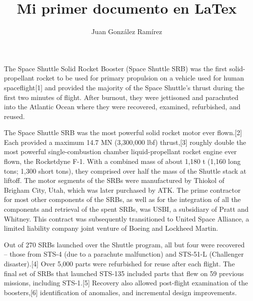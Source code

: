 \documentclass{article}
\title{Mi primer documento en LaTex} %
\author{Juan González Ramírez}
\begin{document}
\maketitle %
The Space Shuttle Solid Rocket Booster (Space Shuttle SRB) was the first solid-propellant rocket to be used for primary propulsion on a vehicle used for human spaceflight[1] and provided the majority of the Space Shuttle's thrust during the first two minutes of flight. After burnout, they were jettisoned and parachuted into the Atlantic Ocean where they were recovered, examined, refurbished, and reused.

The Space Shuttle SRB was the most powerful solid rocket motor ever flown.[2] Each provided a maximum 14.7 MN (3,300,000 lbf) thrust,[3] roughly double the most powerful single-combustion chamber liquid-propellant rocket engine ever flown, the Rocketdyne F-1. With a combined mass of about 1,180 t (1,160 long tons; 1,300 short tons), they comprised over half the mass of the Shuttle stack at liftoff. The motor segments of the SRBs were manufactured by Thiokol of Brigham City, Utah, which was later purchased by ATK. The prime contractor for most other components of the SRBs, as well as for the integration of all the components and retrieval of the spent SRBs, was USBI, a subsidiary of Pratt and Whitney. This contract was subsequently transitioned to United Space Alliance, a limited liability company joint venture of Boeing and Lockheed Martin.

Out of 270 SRBs launched over the Shuttle program, all but four were recovered – those from STS-4 (due to a parachute malfunction) and STS-51-L (Challenger disaster).[4] Over 5,000 parts were refurbished for reuse after each flight. The final set of SRBs that launched STS-135 included parts that flew on 59 previous missions, including STS-1.[5] Recovery also allowed post-flight examination of the boosters,[6] identification of anomalies, and incremental design improvements.
\end{document}
